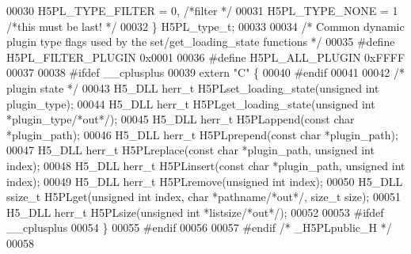 \begin{DoxyCode}
00030     H5PL\_TYPE\_FILTER       = 0,   \textcolor{comment}{/*filter                   */}
00031     H5PL\_TYPE\_NONE         = 1    \textcolor{comment}{/*this must be last!       */}
00032 \} H5PL\_type\_t;
00033 
00034 \textcolor{comment}{/* Common dynamic plugin type flags used by the set/get\_loading\_state functions */}
00035 \textcolor{preprocessor}{#define H5PL\_FILTER\_PLUGIN 0x0001}
00036 \textcolor{preprocessor}{#define H5PL\_ALL\_PLUGIN 0xFFFF}
00037 
00038 \textcolor{preprocessor}{#ifdef \_\_cplusplus}
00039 \textcolor{keyword}{extern} \textcolor{stringliteral}{"C"} \{
00040 \textcolor{preprocessor}{#endif}
00041 
00042 \textcolor{comment}{/* plugin state */}
00043 H5\_DLL herr\_t H5PLset\_loading\_state(\textcolor{keywordtype}{unsigned} \textcolor{keywordtype}{int} plugin\_type);
00044 H5\_DLL herr\_t H5PLget\_loading\_state(\textcolor{keywordtype}{unsigned} \textcolor{keywordtype}{int} *plugin\_type\textcolor{comment}{/*out*/});
00045 H5\_DLL herr\_t H5PLappend(\textcolor{keyword}{const} \textcolor{keywordtype}{char} *plugin\_path);
00046 H5\_DLL herr\_t H5PLprepend(\textcolor{keyword}{const} \textcolor{keywordtype}{char} *plugin\_path);
00047 H5\_DLL herr\_t H5PLreplace(\textcolor{keyword}{const} \textcolor{keywordtype}{char} *plugin\_path, \textcolor{keywordtype}{unsigned} \textcolor{keywordtype}{int} index);
00048 H5\_DLL herr\_t H5PLinsert(\textcolor{keyword}{const} \textcolor{keywordtype}{char} *plugin\_path, \textcolor{keywordtype}{unsigned} \textcolor{keywordtype}{int} index);
00049 H5\_DLL herr\_t H5PLremove(\textcolor{keywordtype}{unsigned} \textcolor{keywordtype}{int} index);
00050 H5\_DLL ssize\_t H5PLget(\textcolor{keywordtype}{unsigned} \textcolor{keywordtype}{int} index, \textcolor{keywordtype}{char} *pathname\textcolor{comment}{/*out*/}, \textcolor{keywordtype}{size\_t} size);
00051 H5\_DLL herr\_t H5PLsize(\textcolor{keywordtype}{unsigned} \textcolor{keywordtype}{int} *listsize\textcolor{comment}{/*out*/});
00052 
00053 \textcolor{preprocessor}{#ifdef \_\_cplusplus}
00054 \}
00055 \textcolor{preprocessor}{#endif}
00056 
00057 \textcolor{preprocessor}{#endif }\textcolor{comment}{/* \_H5PLpublic\_H */}\textcolor{preprocessor}{}
00058 
\end{DoxyCode}
